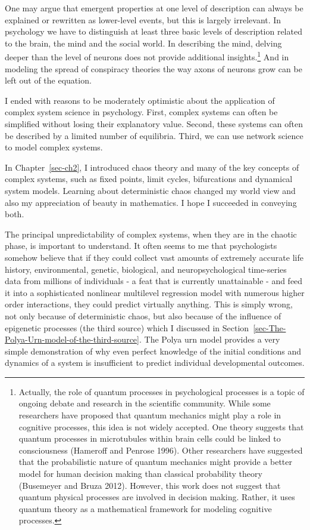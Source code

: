 \documentclass[
  a4paper,
  DIV=11,
  numbers=noendperiod,
  oneside]{scrreprt}
\begin{document}
One may argue that emergent properties at one level of description can
always be explained or rewritten as lower-level events, but this is
largely irrelevant. In psychology we have to distinguish at least three
basic levels of description related to the brain, the mind and the
social world. In describing the mind, delving deeper than the level of
neurons does not provide additional insights.\footnote{Actually, the
  role of quantum processes in psychological processes is a topic of
  ongoing debate and research in the scientific community. While some
  researchers have proposed that quantum mechanics might play a role in
  cognitive processes, this idea is not widely accepted. One theory
  suggests that quantum processes in microtubules within brain cells
  could be linked to consciousness (Hameroff and Penrose 1996). Other
  researchers have suggested that the probabilistic nature of quantum
  mechanics might provide a better model for human decision making than
  classical probability theory (Busemeyer and Bruza 2012). However, this
  work does not suggest that quantum physical processes are involved in
  decision making. Rather, it uses quantum theory as a mathematical
  framework for modeling cognitive processes.} And in modeling the
spread of conspiracy theories the way axons of neurons grow can be left
out of the equation.

I ended with reasons to be moderately optimistic about the application
of complex system science in psychology. First, complex systems can
often be simplified without losing their explanatory value. Second,
these systems can often be described by a limited number of equilibria.
Third, we can use network science to model complex systems.

In Chapter~\ref{sec-ch2}, I introduced chaos theory and many of the key
concepts of complex systems, such as fixed points, limit cycles,
bifurcations and dynamical system models. Learning about deterministic
chaos changed my world view and also my appreciation of beauty in
mathematics. I hope I succeeded in conveying both.

The principal unpredictability of complex systems, when they are in the
chaotic phase, is important to understand. It often seems to me that
psychologists somehow believe that if they could collect vast amounts of
extremely accurate life history, environmental, genetic, biological, and
neuropsychological time-series data from millions of individuals - a
feat that is currently unattainable - and feed it into a sophisticated
nonlinear multilevel regression model with numerous higher order
interactions, they could predict virtually anything. This is simply
wrong, not only because of deterministic chaos, but also because of the
influence of epigenetic processes (the third source) which I discussed
in Section~\ref{sec-The-Polya-Urn-model-of-the-third-source}. The Polya
urn model provides a very simple demonstration of why even perfect
knowledge of the initial conditions and dynamics of a system is
insufficient to predict individual developmental outcomes.
\end{document}
